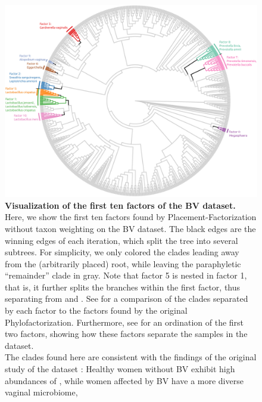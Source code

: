 \begin{figure}[!htbp]
    \centering
     \includegraphics[width=\linewidth]{pdf/factors_tree.pdf}
    \caption[Visualization of the first ten factors of the BV dataset]{
        \textbf{Visualization of the first ten factors of the BV dataset.}
        Here, we show the first ten factors found by Placement-Factorization without taxon weighting on the \ac{BV} dataset.
        The black edges are the winning edges of each iteration, which split the tree into several subtrees.
        For simplicity, we only colored the clades leading away from the (arbitrarily placed) root,
        while leaving the paraphyletic ``remainder'' clade in gray.
        Note that factor 5 is nested in factor 1, that is, it further splits the branches within the first factor,
        thus separating 
        from  and .
        See  for a comparison of the clades separated by each factor
        to the factors found by the original Phylofactorization.
        Furthermore, see  for an ordination
        of the first two factors, showing how these factors separate the samples in the dataset.
        \\
        The clades found here are consistent with the findings of the original study of the dataset \cite{Srinivasan2012}:
        Healthy women without \ac{BV} exhibit high abundances of ,
        while women affected by \ac{BV} have a more diverse vaginal microbiome,
}
\end{figure}
